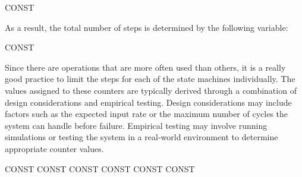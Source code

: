 \begin{zkasm}
    CONST %
\end{zkasm}

As a result, the total number of steps is determined by the following variable:

\begin{zkasm}
    CONST %
\end{zkasm}

Since there are operations that are more often used than others, it is a really good practice to limit the steps for each of the state machines individually. The values assigned to these counters are typically derived through a combination of design considerations and empirical testing. Design considerations may include factors such as the expected input rate or the maximum number of cycles the system can handle before failure. Empirical testing may involve running simulations or testing the system in a real-world environment to determine appropriate counter values.

\begin{zkasm}
    CONST %
    CONST %
    CONST %
    CONST %
    CONST %
    CONST %
\end{zkasm}
